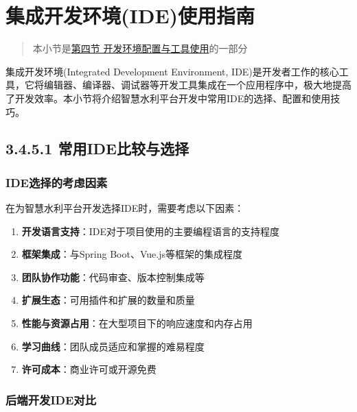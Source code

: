 \section{集成开发环境(IDE)使用指南}\label{ux96c6ux6210ux5f00ux53d1ux73afux5883ideux4f7fux7528ux6307ux5357}

\begin{quote}
本小节是\href{section03-04.md}{第四节 开发环境配置与工具使用}的一部分
\end{quote}

集成开发环境(Integrated Development Environment,
IDE)是开发者工作的核心工具，它将编辑器、编译器、调试器等开发工具集成在一个应用程序中，极大地提高了开发效率。本小节将介绍智慧水利平台开发中常用IDE的选择、配置和使用技巧。

\subsection{3.4.5.1
常用IDE比较与选择}\label{ux5e38ux7528ideux6bd4ux8f83ux4e0eux9009ux62e9}

\subsubsection{IDE选择的考虑因素}\label{ideux9009ux62e9ux7684ux8003ux8651ux56e0ux7d20}

在为智慧水利平台开发选择IDE时，需要考虑以下因素：

\begin{enumerate}
\def\labelenumi{\arabic{enumi}.}
\tightlist
\item
  \textbf{开发语言支持}：IDE对于项目使用的主要编程语言的支持程度
\item
  \textbf{框架集成}：与Spring Boot、Vue.js等框架的集成程度
\item
  \textbf{团队协作功能}：代码审查、版本控制集成等
\item
  \textbf{扩展生态}：可用插件和扩展的数量和质量
\item
  \textbf{性能与资源占用}：在大型项目下的响应速度和内存占用
\item
  \textbf{学习曲线}：团队成员适应和掌握的难易程度
\item
  \textbf{许可成本}：商业许可或开源免费
\end{enumerate}

\subsubsection{后端开发IDE对比}\label{ux540eux7aefux5f00ux53d1ideux5bf9ux6bd4}

